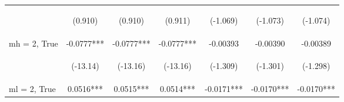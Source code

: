 \documentclass[]{article}
\begin{document}
\begin{center}
\begin{tabular}{lcccccc}
        \vspace{4pt}     & \begin{footnotesize}(0.910)\end{footnotesize}  & \begin{footnotesize}(0.910)\end{footnotesize}  & \begin{footnotesize}(0.911)\end{footnotesize}  & \begin{footnotesize}(-1.069)\end{footnotesize} & \begin{footnotesize}(-1.073)\end{footnotesize} & \begin{footnotesize}(-1.074)\end{footnotesize} \\
        mh = 2, True     & -0.0777***                                     & -0.0777***                                     & -0.0777***                                     & -0.00393                                       & -0.00390                                       & -0.00389                                       \\
        \vspace{4pt}     & \begin{footnotesize}(-13.14)\end{footnotesize} & \begin{footnotesize}(-13.16)\end{footnotesize} & \begin{footnotesize}(-13.16)\end{footnotesize} & \begin{footnotesize}(-1.309)\end{footnotesize} & \begin{footnotesize}(-1.301)\end{footnotesize} & \begin{footnotesize}(-1.298)\end{footnotesize} \\
        ml = 2, True     & 0.0516***                                      & 0.0515***                                      & 0.0514***                                      & -0.0171***                                     & -0.0170***                                     & -0.0170***                                     \\

\end{tabular}
\end{center}
\end{document}
